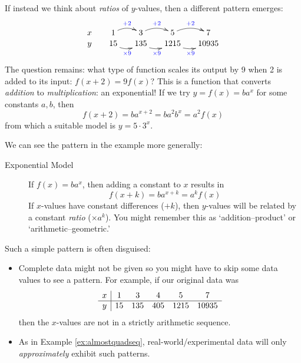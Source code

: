 \begin{example}{}{}
	If instead we think about \emph{ratios} of $y$-values, then a different pattern emerges:
	\[
		\xymatrix @R0pt @C15pt{
			x & 1 \ar@/^/[r]^{\textcolor{blue}{+2}} & 3 \ar@/^/[r]^{\textcolor{blue}{+2}} &  5 \ar@/^/[r]^{\textcolor{blue}{+2}} & 7 \\
			y & 15 \ar@/_/[r]_{\textcolor{blue}{\times 9}} & 135 \ar@/_/[r]_{\textcolor{blue}{\times 9}} & 1215 \ar@/_/[r]_{\textcolor{blue}{\times 9}} & 10935 
		}
	\]
	The question remains: what type of function scales its output by 9 when 2 is added to its input: $f(x+2)=9f(x)$? This is a function that converts \emph{addition} to \emph{multiplication}: an exponential! If we try $y=f(x)=ba^x$ for some constants $a,b$, then
	\[
		f(x+2)=ba^{x+2}=ba^2b^x=a^2f(x)
	\]
	from which a suitable model is $y=5\cdot 3^x$.
\end{example}


We can see the pattern in the example more generally:
\begin{description}
	\item[Exponential Model] If $f(x)=ba^x$, then adding a constant to $x$ results in
		\[
			f(x+k)=ba^{x+k}=a^kf(x)
		\]
		If $x$-values have constant differences ($+k$), then $y$-values will be related by a constant \emph{ratio} ($\times a^k$). You might remember this as `addition--product' or `arithmetic--geometric.'
\end{description}

Such a simple pattern is often disguised:
\begin{itemize}
  \item Complete data might not be given so you might have to skip some data values to see a pattern. For example, if our original data was
  \[
  	\begin{array}[t]{c|ccccc}
			x&1&3&4&5&7\\\hline
			y&15&135&405&1215&10935
		\end{array}
	\]
	then the $x$-values are not in a strictly arithmetic sequence.
	\item As in Example \ref{ex:almostquadseq}, real-world/experimental data will only \emph{approximately} exhibit such patterns.
\end{itemize}
\goodbreak


